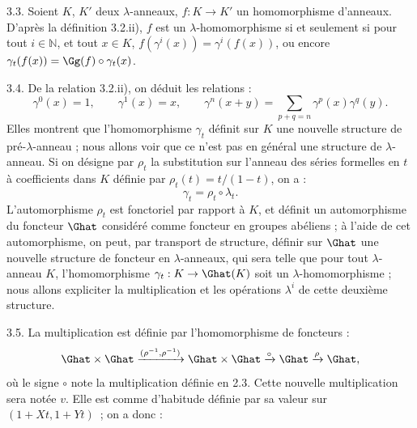 
3.3.
Soient \(K\), \(K'\) deux \(\lambda\)-anneaux, \(f:K\to K'\) un homomorphisme d'anneaux. D'après la définition 3.2.ii), \(f\) est un \(\lambda\)-homomorphisme si et seulement si pour tout \(i\in\mathbb N\), et tout \(x\in K\), \(f(\gamma^i(x))=\gamma^i(f(x))\), ou encore \(\gamma_t(f(x))=\Gg(f)\circ\gamma_t(x)\).

3.4. De la relation 3.2.ii), on déduit les relations :
\begin{equation}\tag{3.4.1}
  \gamma^0(x)=1,
  \qquad \gamma^1(x)=x,
  \qquad \gamma^n(x+y)=\sum_{p+q=n}\gamma^p(x)\gamma^q(y).
\end{equation}
Elles montrent que l'homomorphisme \(\gamma_t\) définit sur \(K\) une nouvelle structure de pré-\(\lambda\)-anneau ; nous allons voir que ce n'est pas en général une structure de \(\lambda\)-anneau. Si on désigne par \(\rho_t\) la substitution sur l'anneau des séries formelles en \(t\) à coefficients dans \(K\) définie par \(\rho_t(t)=t/(1-t)\), on a :
\[
  \gamma_t=\rho_t\circ\lambda_t.
\]
L'automorphisme \(\rho_t\) est fonctoriel par rapport à \(K\), et définit un automorphisme du foncteur \(\Ghat\) considéré comme foncteur en groupes abéliens ; à l'aide de cet automorphisme, on peut, par transport de structure, définir sur \(\Ghat\) une nouvelle structure de foncteur en \(\lambda\)-anneaux, qui sera telle que pour tout \(\lambda\)-anneau \(K\), l'homomorphisme \(\gamma_t:K\to\Ghat(K)\) soit un \(\lambda\)-homomorphisme ; nous allons expliciter la multiplication et les opérations \(\lambda^i\) de cette deuxième structure.

3.5. La multiplication est définie par l'homomorphisme de foncteurs :
\[
  \Ghat\times\Ghat\xrightarrow{(\rho^{-1},\rho^{-1})}
  \Ghat\times\Ghat\xrightarrow{\circ}\Ghat\xrightarrow{\rho}\Ghat ,
\]
où le signe \(\circ\) note la multiplication définie en 2.3. Cette nouvelle multiplication sera notée \(v\). Elle est comme d'habitude définie par sa valeur sur \((1+Xt,1+Yt)\)~; on a donc :
